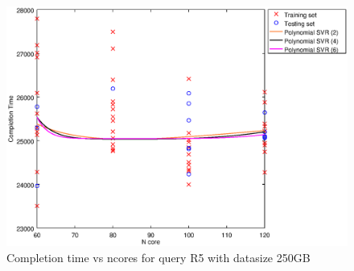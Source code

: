 
\begin {figure}[hbtp]
\centering
\includegraphics[width=\textwidth]{output/R5_250_ONLY_1_OVER_NCORES/plot_R5_250_bestmodels.eps}
\caption{Completion time vs ncores for query R5 with datasize 250GB}
\label{fig:all_nonlinear_R5_250}
\end {figure}
